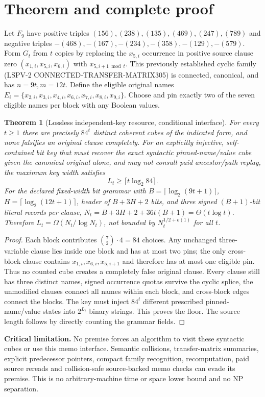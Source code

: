 \documentclass[10pt]{article}
\newtheorem{theorem}{Theorem}
\begin{document}
\section{Theorem and complete proof}
Let $F_9$ have positive triples $(156),(238),(135),(469),(247),(789)$ and negative triples $-(468),-(167),-(234),-(358),-(129),-(579)$. Form $G_t$ from $t$ copies by replacing the $x_{5,i}$ occurrence in positive source clause zero $(x_{1,i},x_{5,i},x_{6,i})$ with $x_{5,i+1\bmod t}$. This previously established cyclic family (LSPV-2 CONNECTED-TRANSFER-MATRIX305) is connected, canonical, and has $n=9t,m=12t$. Define the eligible original names $E_i=\{x_{2,i},x_{3,i},x_{4,i},x_{6,i},x_{7,i},x_{8,i},x_{9,i}\}$. Choose and pin exactly two of the seven eligible names per block with any Boolean values.
\begin{theorem}[Lossless independent-key resource, conditional interface]
For every $t\ge1$ there are precisely $84^t$ distinct coherent cubes of the indicated form, and none falsifies an original clause completely. For an explicitly \emph{injective, self-contained} bit key that must recover the \emph{exact syntactic pinned-name/value cube} given the canonical original alone, and may not consult paid ancestor/path replay, the maximum key width satisfies
\[
L_t\ge\lceil t\log_2 84\rceil.
\]
For the declared fixed-width bit grammar with $B=\lceil\log_2(9t+1)\rceil$, $H=\lceil\log_2(12t+1)\rceil$, header of $B+3H+2$ bits, and three signed $(B+1)$-bit literal records per clause, $N_t=B+3H+2+36t(B+1)=\Theta(t\log t)$. Therefore $L_t=\Omega(N_t/\log N_t)$, not bounded by $N_t^{1/2+o(1)}$ for all $t$.
\end{theorem}
\begin{proof}
Each block contributes $\binom72\cdot4=84$ choices. Any unchanged three-variable clause lies inside one block and has at most two pins; the only cross-block clause contains $x_{1,i},x_{6,i},x_{5,i+1}$ and therefore has at most one eligible pin. Thus no counted cube creates a completely false original clause. Every clause still has three distinct names, signed occurrence quotas survive the cyclic splice, the unmodified clauses connect all names within each block, and cross-block edges connect the blocks. The key must inject $84^t$ different prescribed pinned-name/value states into $2^{L_t}$ binary strings. This proves the floor. The source length follows by directly counting the grammar fields.
\end{proof}
\noindent\textbf{Critical limitation.} No premise forces an algorithm to visit these syntactic cubes or use this memo interface. Semantic collisions, transfer-matrix summaries, explicit predecessor pointers, compact family recognition, recomputation, paid source rereads and collision-safe source-backed memo checks can evade its premise. This is no arbitrary-machine time or space lower bound and no NP separation.
\end{document}
